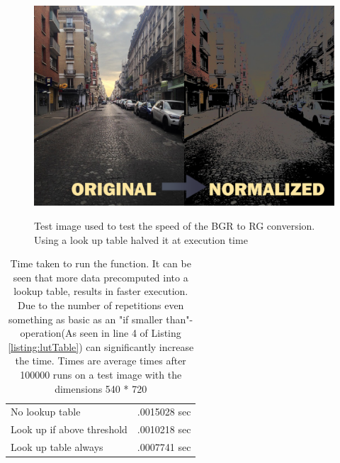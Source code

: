 \begin{multicols}{2}
	\begin{figure}[H]
	\includegraphics[width=1\linewidth]{figure/Analysis/Normalized.png}
	\label{rgConversion}
	\caption{Test image used to test the speed of the BGR to RG conversion. Using a look up table halved it at execution time}
	\end{figure}

    \columnbreak
	\begin{table}[H]
		\centering
		\caption{Time taken to run the function. It can be seen that more data precomputed into a lookup table, results in faster execution. Due to the number of repetitions even something as basic as an "if smaller than"-operation(As seen in line 4 of Listing \ref{listing:lutTable}) can significantly increase the time. Times are average times after 100000 runs on a test image with the dimensions 540 * 720}
		\begin{tabular}{ l | l }
			\hline			
			No lookup table & .0015028 sec\\
			Look up if above threshold & .0010218 sec\\
			Look up table always& .0007741 sec\\
			\hline 
		\end{tabular}
	\label{table:rgConvSpeed}
	\end{table}
\end{multicols}

